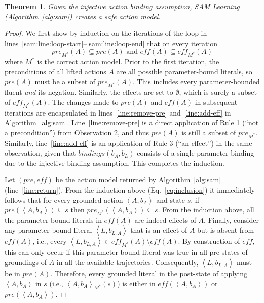 \documentclass{article}
\newtheorem{theorem}{Theorem}
\newcommand{\tuple}[1]{\ensuremath{\left \langle #1 \right \rangle }}
\newcommand{\pre}{\textit{pre}}
\newcommand{\eff}{\textit{eff}}
\newcommand{\realm}{\ensuremath{M^*}\xspace}
\newcommand{\liftl}{L}
\newcommand{\lifta}{A}
\newcommand{\bindings}{\textit{bindings}}
\begin{document}
\begin{theorem}\label{safe-sam-thm}
Given the injective action binding assumption,
SAM Learning (Algorithm~\ref{alg:sam}) creates a safe action model. 
\end{theorem}
\begin{proof}
We first show by induction on the iterations of the loop in lines~\ref{sam:line:loop-start}--\ref{sam:line:loop-end} that on every iteration
\begin{equation}
    \pre_{\realm}(\lifta)\subseteq\pre(\lifta) \text{ and }
\eff(\lifta)\subseteq\eff_{\realm}(\lifta)
\label{eq:inclusion}
\end{equation}
where $\realm$ is the correct action model. 
Prior to the first iteration, the preconditions of all lifted actions $\lifta$ are all possible parameter-bound literals, so $\pre(\lifta)$ must be a subset of $\pre_{\realm}(\lifta)$.
This includes every parameter-bounded fluent \emph{and} its negation. 
Similarly, the effects are set to $\emptyset$, which is surely a subset of $\eff_{\realm}(\lifta)$.
The changes made to $\pre(\lifta)$ and $\eff(\lifta)$ in subsequent iterations are encapsulated in lines~\ref{line:remove-pre} and~\ref{line:add-eff} in Algorithm~\ref{alg:sam}. 
Line~\ref{line:remove-pre} is a direct application
of Rule 1 (``not a precondition'') from Observation 2, 
and thus $\pre(\lifta)$ is still a subset of $\pre_{\realm}$. 
Similarly, line~\ref{line:add-eff} is an application of Rule 3 (``an effect'') in the same observation, given that $\bindings(b_\lifta, b_\liftl)$ consists of a single parameter binding due to the injective binding assumption. 
This completes the induction.

Let $(\pre, \eff)$ be the action model returned by Algorithm~\ref{alg:sam} (line~\ref{line:return}).  
From the induction above (Eq.~\ref{eq:inclusion}) it immediately follows that for every grounded action $\tuple{\lifta, b_{\lifta}}$ and state $s$, if 
$\pre(\tuple{\lifta, b_{\lifta}})\subseteq s$ then 
$\pre_{\realm}(\tuple{\lifta, b_{\lifta}})\subseteq s$. 
From the induction above, all the parameter-bound literals in $\eff(\lifta)$ are indeed effects of $\lifta$. 
Finally, consider any parameter-bound literal $\tuple{\liftl, b_{\liftl,\lifta}}$
that is an effect of $\lifta$ but is absent from $\eff(\lifta)$, i.e., every 
$\tuple{\liftl, b_{\liftl,\lifta}}\in \eff_{\realm}(A)\setminus\eff(A)$. 
By construction of $\eff$, this can only occur if this parameter-bound literal was true in all pre-states of groundings of $\lifta$ in all the available trajectories. %
Consequently, $\tuple{\liftl, b_{\liftl,\lifta}}$ must be in $\pre(\lifta)$. 
Therefore, every grounded literal in the post-state of applying $\tuple{\lifta, b_{\lifta}}$ in $s$ (i.e., $\tuple{\lifta, b_{\lifta}}_{\realm}(s)$) is either 
in $\eff(\tuple{\lifta, b_{\lifta}})$ or 
$\pre(\tuple{\lifta, b_{\lifta}})$. 
\end{proof}
\end{document}

